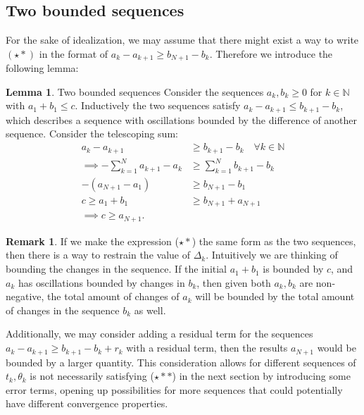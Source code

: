 \documentclass[]{article}
\theoremstyle{definition}
\newtheorem{lemma}{Lemma}[subsection]  %
\newtheorem{remark}{Remark}[subsection]
{
    \newtheorem{assumption}{Assumption}
}
\begin{document}
    \subsection{Two bounded sequences}
        For the sake of idealization, we may assume that there might exist a way to write $(\star*)$ in the format of $a_k- a_{k + 1}\ge b_{N+ 1} - b_k$. Therefore we introduce the following lemma: 
        \begin{lemma}{Two bounded sequences}
            Consider the sequences $a_k, b_k \ge 0$ for $k\in \mathbb N$ with $a_1 + b_1 \le c$. Inductively the two sequences satisfy $a_{k} - a_{k + 1} \le b_{k + 1} - b_k$, which describes a sequence with oscillations bounded by the difference of another sequence. Consider the telescoping sum: 
            \begin{align*}
                a_{k} - a_{k + 1} 
                &\ge b_{k + 1} - b_k \quad \forall k \in \mathbb N
                \\
                \implies
                -\sum_{k = 1}^{N}
                a_{k + 1} - a_k 
                &\ge 
                \sum_{k = 1}^{N} b_{k + 1} - b_k
                \\
                - (a_{N + 1} - a_1) 
                &\ge b_{N + 1} - b_1
                \\
                c\ge a_1 + b_1
                &\ge
                b_{N + 1} + a_{N +1}
                \\
                \implies c \ge a_{N+1}. 
            \end{align*}
        \end{lemma}
        \begin{remark}
            If we make the expression ($\star*$) the same form as the two sequences, then there is a way to restrain the value of $\Delta_k$. Intuitively we are thinking of bounding the changes in the sequence. If the initial $a_1 + b_1$ is bounded by $c$, and $a_k$ has oscillations bounded by changes in $b_k$, then given both $a_k, b_k$ are non-negative, the total amount of changes of $a_k$ will be bounded by the total amount of changes in the sequence $b_k$ as well. 
            \par
            Additionally, we may consider adding a residual term for the sequences $a_{k} - a_{k + 1} \ge b_{k + 1} - b_k + r_k$ with a residual term, then the results $a_{N + 1}$ would be bounded by a larger quantity. This consideration allows for different sequences of $t_k, \theta_k$ is not necessarily satisfying ($\star**$) in the next section by introducing some error terms, opening up possibilities for more sequences that could potentially have different convergence properties. 
        \end{remark}
\end{document}
